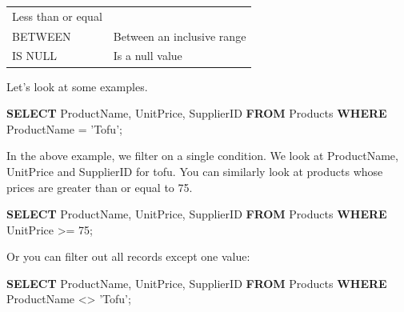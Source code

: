\documentclass[]{book}
\makeatletter
\newenvironment{Shaded}{\begin{snugshade}}{\end{snugshade}}
\newcommand{\KeywordTok}[1]{\textcolor[rgb]{0.13,0.29,0.53}{\textbf{{#1}}}}
\newcommand{\DecValTok}[1]{\textcolor[rgb]{0.00,0.00,0.81}{{#1}}}
\newcommand{\StringTok}[1]{\textcolor[rgb]{0.31,0.60,0.02}{{#1}}}
\newcommand{\NormalTok}[1]{{#1}}
\newenvironment{kframe}{%
\medskip{}
\setlength{\fboxsep}{.8em}
 \def\at@end@of@kframe{}%
 \ifinner\ifhmode%
  \def\at@end@of@kframe{\end{minipage}}%
  \begin{minipage}{\columnwidth}%
 \fi\fi%
 \def\FrameCommand##1{\hskip\@totalleftmargin \hskip-\fboxsep
 \colorbox{shadecolor}{##1}\hskip-\fboxsep
     \hskip-\linewidth \hskip-\@totalleftmargin \hskip\columnwidth}%
 \MakeFramed {\advance\hsize-\width
   \@totalleftmargin\z@ \linewidth\hsize
   \@setminipage}}%
 {\par\unskip\endMakeFramed%
 \at@end@of@kframe}
\renewenvironment{Shaded}{\begin{kframe}}{\end{kframe}}
\theoremstyle{definition}
\theoremstyle{definition}
\theoremstyle{remark}
\makeatother
\begin{document}
\begin{longtable}[]{@{}ll@{}}
\begin{minipage}[t]{0.18\columnwidth}
Less than or equal\strut
\end{minipage}\tabularnewline
\begin{minipage}[t]{0.13\columnwidth}\raggedright\strut
BETWEEN\strut
\end{minipage} & \begin{minipage}[t]{0.18\columnwidth}\raggedright\strut
Between an inclusive range\strut
\end{minipage}\tabularnewline
\begin{minipage}[t]{0.13\columnwidth}\raggedright\strut
IS NULL\strut
\end{minipage} & \begin{minipage}[t]{0.18\columnwidth}\raggedright\strut
Is a null value\strut
\end{minipage}\tabularnewline
\bottomrule
\end{longtable}

Let's look at some examples.

\begin{Shaded}
\begin{Highlighting}[]
\KeywordTok{SELECT} \NormalTok{ProductName,}
\NormalTok{UnitPrice,}
\NormalTok{SupplierID}
\KeywordTok{FROM} \NormalTok{Products}
\KeywordTok{WHERE} \NormalTok{ProductName = }\StringTok{'Tofu'}\NormalTok{;}
\end{Highlighting}
\end{Shaded}

In the above example, we filter on a single condition. We look at
ProductName, UnitPrice and SupplierID for tofu. You can similarly look
at products whose prices are greater than or equal to 75.

\begin{Shaded}
\begin{Highlighting}[]
\KeywordTok{SELECT} \NormalTok{ProductName,}
\NormalTok{UnitPrice,}
\NormalTok{SupplierID}
\KeywordTok{FROM} \NormalTok{Products}
\KeywordTok{WHERE} \NormalTok{UnitPrice >= }\DecValTok{75}\NormalTok{;}
\end{Highlighting}
\end{Shaded}

Or you can filter out all records except one value:

\begin{Shaded}
\begin{Highlighting}[]
\KeywordTok{SELECT} \NormalTok{ProductName,}
\NormalTok{UnitPrice,}
\NormalTok{SupplierID}
\KeywordTok{FROM} \NormalTok{Products}
\KeywordTok{WHERE} \NormalTok{ProductName <> }\StringTok{'Tofu'}\NormalTok{;}
\end{Highlighting}
\end{Shaded}
\end{document}
